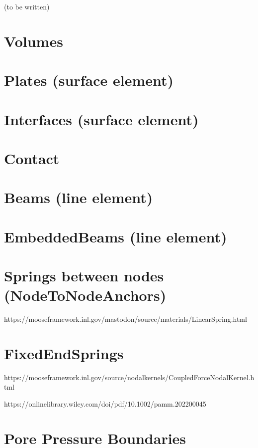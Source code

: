 (to be written)

\section{Volumes}


\section{Plates (surface element)}


\section{Interfaces (surface element)}


\section{Contact}


\section{Beams (line element)}


\section{EmbeddedBeams (line element)}


\section{Springs between nodes (NodeToNodeAnchors)}

https://mooseframework.inl.gov/mastodon/source/materials/LinearSpring.html


\section{FixedEndSprings}

https://mooseframework.inl.gov/source/nodalkernels/CoupledForceNodalKernel.html

https://onlinelibrary.wiley.com/doi/pdf/10.1002/pamm.202200045

\section{Pore Pressure Boundaries}
